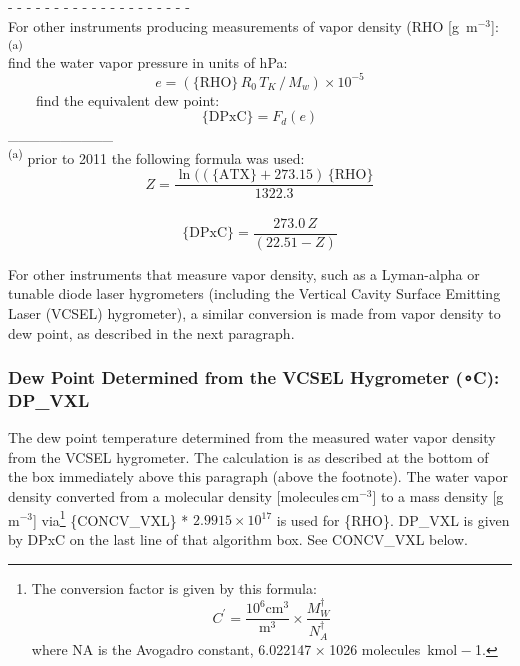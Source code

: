 \documentclass[
  english,
]{book}
\begin{document}
- - - - - - - - - - - - - - - - - - - -\\
For other instruments producing measurements of vapor density (RHO
{[}g~m\(^{-3}\){]}:\textsuperscript{(a)}\\
\hspace*{0.333em}\hspace*{0.333em}\hspace*{0.333em}\hspace*{0.333em}find the water vapor pressure in units of hPa:
\begin{equation}
e = (\mathrm{\{RHO\}}\,R_{0}\,T_{K}\,/\,M_{w})\times 10^{-5}
\label{eq:RHObox}
\end{equation}
~~~~find the equivalent dew point:\\
\begin{equation}
\mathrm{\{DPxC\}} = F_{d}(e)
\label{eq:DPxC2}
\end{equation}
\_\_\_\_\_\_\_\_\_\_\\
\textsuperscript{(a)} prior to 2011 the following formula was used:
\[Z=\frac{\ln((\mathrm{\{ATX\}}+273.15)\,\mathrm{\{RHO\}}}{1322.3}\]\\
\[\mathrm{\{DPxC\}}=\frac{273.0\,Z}{(22.51-Z)}\]

For other instruments that measure vapor density, such as a Lyman-alpha or tunable diode laser hygrometers (including the Vertical Cavity Surface Emitting Laser (VCSEL) hygrometer), a similar conversion is made from vapor density to dew point, as described in the next paragraph.

\hypertarget{vcsel-dp}{%
\subsubsection*{\texorpdfstring{Dew Point Determined from the VCSEL Hygrometer ({∘}C): DP\_VXL}{Dew Point Determined from the VCSEL Hygrometer (∘C): DP\_VXL}}\label{vcsel-dp}}

The dew point temperature determined from the measured water vapor density from the VCSEL hygrometer. The calculation is as described at the bottom of the box immediately above this paragraph (above the footnote). The water vapor density converted from a molecular density {[}molecules\(\,\)cm\(^{-3}\){]} to a mass density {[}g\(\,\)m\(^{-3}\){]} via\footnote{The conversion factor is given by this formula:
  {\[C^{\prime}=\frac{10^{6}\mathrm{cm}^{3}}{\mathrm{m}^{3}}\times\frac{M_{W}^{\dagger}}{N_{A}^{\dagger}}\]} where {NA} is the Avogadro constant, 6.022147{ × 1026} molecules~kmol{ − 1}.}
\{CONCV\_VXL\} * \(2.9915\times 10^{17}\)
is used for \{RHO\}. DP\_VXL is given by DPxC on the last line of that algorithm box. See CONCV\_VXL below.
\end{document}
